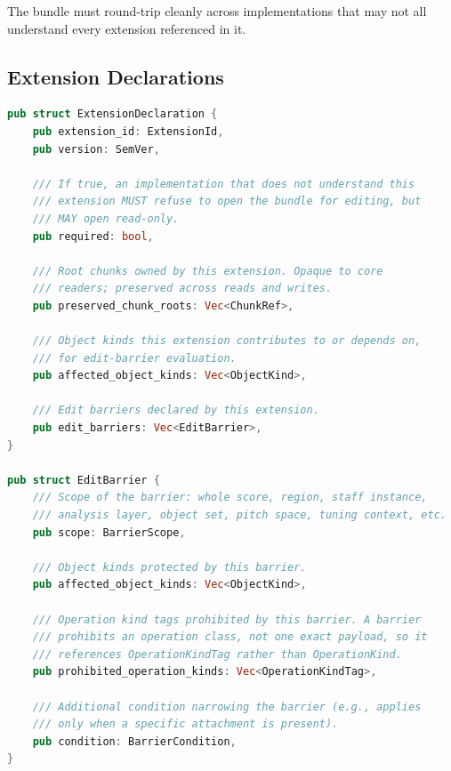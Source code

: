 \documentclass[11pt,letterpaper]{report}
\begin{document}
The bundle must round-trip cleanly across implementations that may
not all understand every extension referenced in it.

\subsection{Extension Declarations}

\begin{lstlisting}[language=Rust]
pub struct ExtensionDeclaration {
    pub extension_id: ExtensionId,
    pub version: SemVer,

    /// If true, an implementation that does not understand this
    /// extension MUST refuse to open the bundle for editing, but
    /// MAY open read-only.
    pub required: bool,

    /// Root chunks owned by this extension. Opaque to core
    /// readers; preserved across reads and writes.
    pub preserved_chunk_roots: Vec<ChunkRef>,

    /// Object kinds this extension contributes to or depends on,
    /// for edit-barrier evaluation.
    pub affected_object_kinds: Vec<ObjectKind>,

    /// Edit barriers declared by this extension.
    pub edit_barriers: Vec<EditBarrier>,
}

pub struct EditBarrier {
    /// Scope of the barrier: whole score, region, staff instance,
    /// analysis layer, object set, pitch space, tuning context, etc.
    pub scope: BarrierScope,

    /// Object kinds protected by this barrier.
    pub affected_object_kinds: Vec<ObjectKind>,

    /// Operation kind tags prohibited by this barrier. A barrier
    /// prohibits an operation class, not one exact payload, so it
    /// references OperationKindTag rather than OperationKind.
    pub prohibited_operation_kinds: Vec<OperationKindTag>,

    /// Additional condition narrowing the barrier (e.g., applies
    /// only when a specific attachment is present).
    pub condition: BarrierCondition,
}


\end{lstlisting}
\end{document}
